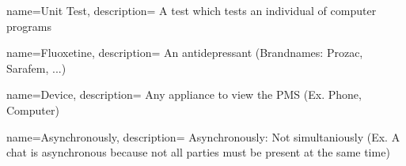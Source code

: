 {  
    name={Unit Test},
    description={
        A test which tests an individual of computer programs
    }
}

{  
    name={Fluoxetine},
    description={
        An antidepressant (Brandnames: Prozac, Sarafem, ...)
    }
}

{  
    name={Device},
    description={
      Any appliance to view the PMS (Ex. Phone, Computer)
    }
}

{  
    name={Asynchronously},
    description={
      Asynchronously: Not simultaniously (Ex. A chat is asynchronous because not all parties must be present at the same time)
    }
}
